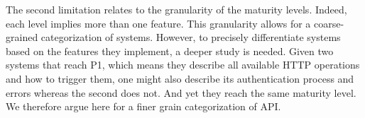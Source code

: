 The second limitation relates to the granularity of the maturity levels. Indeed, each level implies more than one feature. This granularity allows for a coarse-grained categorization of systems. 
However, to precisely differentiate systems based on the features they implement, a deeper study is needed. 
Given two systems that reach P1, which means they describe all available HTTP operations and how to trigger them, one might also describe its authentication process and errors whereas the second does not. 
And yet they reach the same maturity level. 
We therefore argue here for a finer grain categorization of API.%
